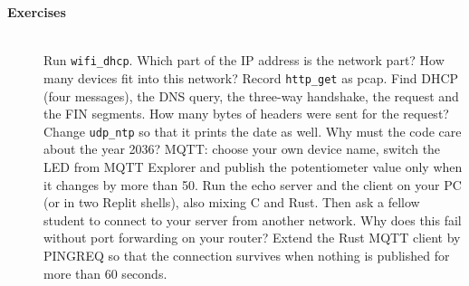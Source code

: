 \begin{description}
\item[{\rot\bf Exercises}]~\\[-\lblskip]
\bi
	\ite Run \texttt{wifi\_dhcp}. Which part of the IP address is the network part? How many devices fit into this network?
	\ite Record \texttt{http\_get} as pcap. Find DHCP (four messages), the DNS query, the three-way handshake, the request and the FIN segments. How many bytes of headers were sent for the request?
	\ite Change \texttt{udp\_ntp} so that it prints the date as well. Why must the code care about the year 2036?
	\ite MQTT: choose your own device name, switch the LED from MQTT Explorer and publish the potentiometer value only when it changes by more than 50.
	\ite Run the echo server and the client on your PC (or in two Replit shells), also mixing C and Rust. Then ask a fellow student to connect to your server from another network. Why does this fail without port forwarding on your router?
	\ite Extend the Rust MQTT client by PINGREQ so that the connection survives when nothing is published for more than 60 seconds.
\ei
\end{description}
